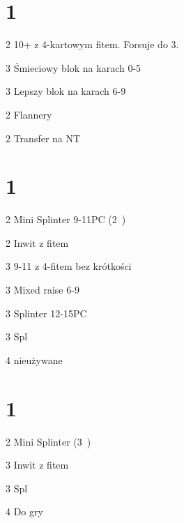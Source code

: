 \documentclass[12pt, a4paper]{article}
\begin{document}
\vspace*{1cm}
\section*{1\diams}

\sequence{{1\diams}}
\begin{options}[2]
	\item[2\diams] 10+ z 4-kartowym fitem. Forsuje do 3\diams.
	\item[3\clubs\alrt] Śmieciowy blok na karach 0-5 \imp
	\item[3\diams] Lepszy blok na karach 6-9
	\item[2\hearts\alrt] Flannery
	\item[2\spades\alrt] Transfer na NT 
\end{options}



\vspace*{1cm}
\section*{1\hearts}
\sequence{{1\hearts}}
\begin{options}[2]
	\item[2\spades\alrt] Mini Splinter 9-11PC \gf (2\nt\ \lsf) \imp
	\item[2\nt\alrt] Inwit z fitem
	\item[3\clubs\alrt] 9-11 z 4-fitem bez krótkości
	\item[3\diams\alrt] Mixed raise 6-9
	\item[3\spades] Splinter 12-15PC
	\item[3\nt\alrt] Spl \diams
	\item[4\diams] nieużywane
\end{options}


\vspace*{1cm}
\section*{1\spades}
\sequence{{1\spades}}
\begin{options}[2]
	\item[2\nt\alrt] Mini Splinter (3\clubs\ \lsf)
	\item[3\hearts\alrt] Inwit z fitem
	\item[3\nt] Spl \hearts
	\item[4\hearts] Do gry \imp
\end{options}
\end{document}
